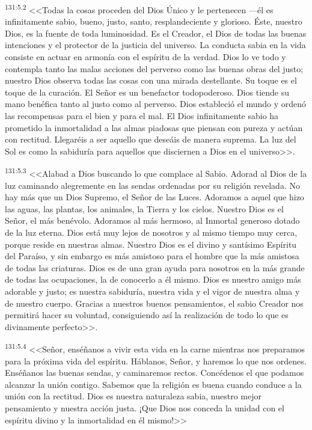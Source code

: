 \par 
\textsuperscript{131:5.2} <<Todas la cosas proceden del Dios Único y le pertenecen ---él es infinitamente sabio, bueno, justo, santo, resplandeciente y glorioso. Éste, nuestro Dios, es la fuente de toda luminosidad. Es el Creador, el Dios de todas las buenas intenciones y el protector de la justicia del universo. La conducta sabia en la vida consiste en actuar en armonía con el espíritu de la verdad. Dios lo ve todo y contempla tanto las malas acciones del perverso como las buenas obras del justo; nuestro Dios observa todas las cosas con una mirada destellante. Su toque es el toque de la curación. El Señor es un benefactor todopoderoso. Dios tiende su mano benéfica tanto al justo como al perverso. Dios estableció el mundo y ordenó las recompensas para el bien y para el mal. El Dios infinitamente sabio ha prometido la inmortalidad a las almas piadosas que piensan con pureza y actúan con rectitud. Llegaréis a ser aquello que deseáis de manera suprema. La luz del Sol es como la sabiduría para aquellos que disciernen a Dios en el universo>>.

\par 
\textsuperscript{131:5.3} <<Alabad a Dios buscando lo que complace al Sabio. Adorad al Dios de la luz caminando alegremente en las sendas ordenadas por su religión revelada. No hay más que un Dios Supremo, el Señor de las Luces. Adoramos a aquel que hizo las aguas, las plantas, los animales, la Tierra y los cielos. Nuestro Dios es el Señor, el más benévolo. Adoramos al más hermoso, al Inmortal generoso dotado de la luz eterna. Dios está muy lejos de nosotros y al mismo tiempo muy cerca, porque reside en nuestras almas. Nuestro Dios es el divino y santísimo Espíritu del Paraíso, y sin embargo es más amistoso para el hombre que la más amistosa de todas las criaturas. Dios es de una gran ayuda para nosotros en la más grande de todas las ocupaciones, la de conocerlo a él mismo. Dios es nuestro amigo más adorable y justo; es nuestra sabiduría, nuestra vida y el vigor de nuestra alma y de nuestro cuerpo. Gracias a nuestros buenos pensamientos, el sabio Creador nos permitirá hacer su voluntad, consiguiendo así la realización de todo lo que es divinamente perfecto>>.

\par 
\textsuperscript{131:5.4} <<Señor, enséñanos a vivir esta vida en la carne mientras nos preparamos para la próxima vida del espíritu. Háblanos, Señor, y haremos lo que nos ordenes. Enséñanos las buenas sendas, y caminaremos rectos. Concédenos el que podamos alcanzar la unión contigo. Sabemos que la religión es buena cuando conduce a la unión con la rectitud. Dios es nuestra naturaleza sabia, nuestro mejor pensamiento y nuestra acción justa. ¡Que Dios nos conceda la unidad con el espíritu divino y la inmortalidad en él mismo!>>

